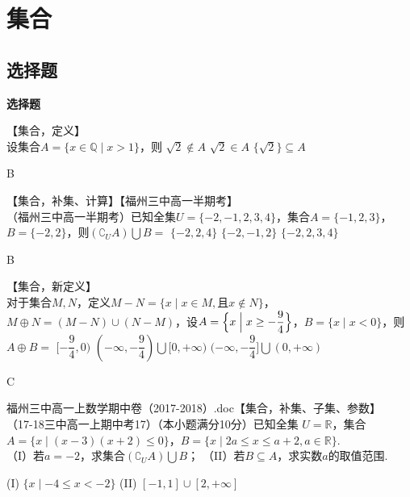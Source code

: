 \startexercise
\section{集合}
  \subsection{选择题}
  \begin{exercise}{\bf 选择题}
    \item 【集合，定义】\\
      设集合$A=\{x\in\mathbb{Q}\mid x>1\}$，则\xz
        {$\sqrt2\notin A$}
        {$\sqrt2\in A$}
        {$\{\sqrt2\}\subseteq A$}
      \begin{answer}
        B
      \end{answer}
    \item 【集合，补集、计算】【福州三中高一半期考】\\
      （福州三中高一半期考）已知全集$U=\{-2,-1,2,3,4\}$，集合$A=\{-1,2,3\}$，$B=\{-2,2\}$，则$(\complement_UA)\bigcup B=$\xz
        {$\{-2,2,4\}$}
        {$\{-2,-1,2\}$}
        {$\{-2,2,3,4\}$}
      \begin{answer}
        B
      \end{answer}
    \item 【集合，新定义】\\
      对于集合$M,N$，定义$M-N=\{x\mid x\in M,\text{且}x\notin N\}$，$M\oplus N=(M-N)\cup(N-M)$，设$A=\Bigl\{x\Bigm| x\geq-\dfrac{9}4\Bigr\}$，$B=\{x\mid x<0\}$，则$A\oplus B=$\xz
        \xx{$(-\dfrac{9}4,0]$}
        {$[-\dfrac{9}4,0)$}
        {$(-\infty,-\dfrac{9}4)\bigcup[0,+\infty)$}
        {$(-\infty,-\dfrac{9}4]\bigcup(0,+\infty)$}
      \begin{answer}
        C
      \end{answer}
    \item 福州三中高一上数学期中卷（2017-2018）.doc【集合，补集、子集、参数】\\
      （17-18三中高一上期中考17）（本小题满分10分）已知全集 $U=\mathbb{R}$，集合$A=\{x\mid (x-3)(x+2)\leq0\} $，$B=\{x\mid 2a\leq x\leq a+2,a\in \mathbb{R} \} $.\\
      （I）若$a=-2 $，求集合$(\complement_UA)\bigcup B $；
      （II）若$B\subseteq A $，求实数$a $的取值范围.
      \begin{answer}
       (I) $\{x\mid-4\leq x<-2 \} $
       (II) $[-1,1]\cup[2,+\infty] $
      \end{answer}
  \end{exercise}
